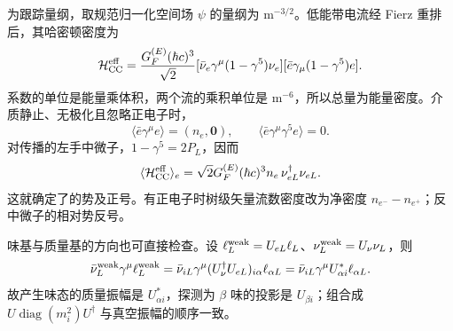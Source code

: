 \begin{derivation}[从带电流平均场到物质势]
为跟踪量纲，取规范归一化空间场 $\psi$ 的量纲为 $\mathrm{m^{-3/2}}$。低能带电流经 Fierz 重排后，其哈密顿密度为
\begin{equation*}
 \mathcal H_{\rm CC}^{\rm eff}
 =\frac{G_F^{(E)}(\hbar c)^3}{\sqrt2}
 [\bar\nu_e\gamma^\mu(1-\gamma^5)\nu_e]
 [\bar e\gamma_\mu(1-\gamma^5)e].
\end{equation*}
系数的单位是能量乘体积，两个流的乘积单位是 $\mathrm{m^{-6}}$，所以总量为能量密度。介质静止、无极化且忽略正电子时，
\begin{equation*}
 \langle\bar e\gamma^\mu e\rangle=(n_e,\boldsymbol0),\qquad
 \langle\bar e\gamma^\mu\gamma^5e\rangle=0.
\end{equation*}
对传播的左手中微子，$1-\gamma^5=2P_L$，因而
\begin{equation*}
 \langle\mathcal H_{\rm CC}^{\rm eff}\rangle_e
 =\sqrt2G_F^{(E)}(\hbar c)^3n_e\,\nu_{eL}^\dagger\nu_{eL}.
\end{equation*}
这就确定了的势及正号。有正电子时树级矢量流数密度改为净密度 $n_{e^-}-n_{e^+}$；反中微子的相对势反号。

味基与质量基的方向也可直接检查。设 $\ell_L^{\rm weak}=U_{eL}\ell_L$、$\nu_L^{\rm weak}=U_\nu\nu_L$，则
\begin{equation*}
 \bar\nu_L^{\rm weak}\gamma^\mu\ell_L^{\rm weak}
 =\bar\nu_{iL}\gamma^\mu(U_\nu^\dagger U_{eL})_{i\alpha}\ell_{\alpha L}
 =\bar\nu_{iL}\gamma^\mu U_{\alpha i}^*\ell_{\alpha L}.
\end{equation*}
故产生味态的质量振幅是 $U_{\alpha i}^*$，探测为 $\beta$ 味的投影是 $U_{\beta i}$；组合成 $U\operatorname{diag}(m_i^2)U^\dagger$ 与真空振幅的顺序一致。
\end{derivation}







